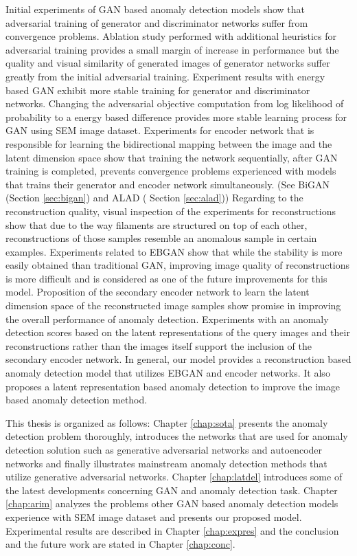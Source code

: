 Initial experiments of GAN based anomaly detection models show that adversarial training of generator 
and discriminator networks suffer from convergence problems. Ablation study performed with additional 
heuristics for adversarial training provides a small margin of increase in performance but the quality 
and visual similarity of generated images of generator networks suffer greatly from the initial 
adversarial training. Experiment results with energy based GAN exhibit 
more stable training for generator and discriminator networks. Changing the adversarial objective computation 
from log likelihood of probability to a energy based difference provides more stable learning process for GAN 
using SEM image dataset. Experiments for encoder network that is responsible for learning the bidirectional 
mapping between the image and the latent dimension space show that training the network sequentially, after 
GAN training is completed, prevents convergence problems experienced with models that trains their 
generator and encoder network simultaneously. (See BiGAN (Section \ref{sec:bigan}) and 
ALAD ( Section \ref{sec:alad})) Regarding to the reconstruction quality, visual inspection of the 
experiments for reconstructions show that due to the way filaments are structured on top of 
each other, reconstructions of those samples resemble an anomalous sample in certain examples. Experiments 
related to EBGAN show that while the stability is more easily obtained than traditional GAN, improving 
image quality of reconstructions is more difficult and is considered as one of the future 
improvements for this model. Proposition of the secondary encoder network to learn the latent dimension space 
of the reconstructed image samples show promise in improving the overall performance of anomaly detection. 
Experiments with an anomaly detection scores based on the latent representations of the query images and their reconstructions rather than the images itself support the inclusion of the secondary encoder network. In 
general, our model provides a reconstruction based anomaly detection model that utilizes EBGAN and encoder networks.
It also proposes a latent representation based anomaly detection to improve the image based anomaly detection method.


This thesis is organized as follows: Chapter \ref{chap:sota} presents the anomaly detection 
problem thoroughly, introduces the networks that are used for  anomaly 
detection solution such as generative adversarial networks and autoencoder networks and finally 
illustrates mainstream anomaly detection methods that utilize generative adversarial 
networks. Chapter \ref{chap:latdel} introduces some of the latest developments concerning 
GAN and anomaly detection task. Chapter \ref{chap:arim} 
analyzes the problems other GAN based anomaly detection models experience with SEM image dataset 
and presents our proposed model. Experimental results are described in Chapter \ref{chap:expres} 
and the conclusion and the future work are  stated in Chapter \ref{chap:conc}.

\endgroup